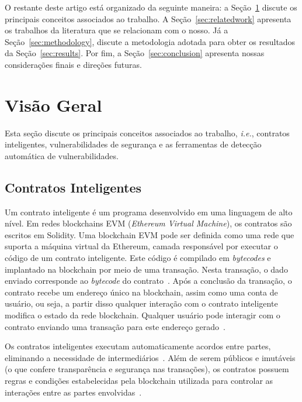 \documentclass[12pt]{article}
\begin{document}
O restante deste artigo está organizado da seguinte maneira: a Seção~\ref{sec:background} discute os principais conceitos associados ao trabalho. A Seção~\ref{sec:relatedwork} apresenta os trabalhos da literatura que se relacionam com o nosso. Já a Seção~\ref{sec:methodology}, discute a metodologia adotada para obter os resultados da Seção~\ref{sec:results}. Por fim, a Seção~\ref{sec:conclusion} apresenta nossas considerações finais e direções futuras.

\section{Visão Geral}\label{sec:background}

Esta seção discute os principais conceitos associados ao trabalho, \textit{i.e.}, contratos inteligentes, vulnerabilidades de segurança e as ferramentas de detecção automática de vulnerabilidades.

\subsection{Contratos Inteligentes}\label{subsec:smartcontracts}

Um contrato inteligente é um programa desenvolvido em uma linguagem de alto nível. Em redes blockchains EVM (\textit{Ethereum Virtual Machine}), os contratos são escritos em Solidity. Uma blockchain EVM pode ser definida como uma rede que suporta a máquina virtual da Ethereum, camada responsável por executar o código de um contrato inteligente. Este código é compilado em \textit{bytecodes} e implantado na blockchain por meio de uma transação. Nesta transação, o dado enviado corresponde ao \textit{bytecode} do contrato~\cite{wood2014ethereum}. Após a conclusão da transação, o contrato recebe um endereço único na blockchain, assim como uma conta de usuário, ou seja, a partir disso qualquer interação com o contrato inteligente modifica o estado da rede blockchain. Qualquer usuário pode interagir com o contrato enviando uma transação para este endereço gerado~\cite{harvey2021defi}. 

Os contratos inteligentes executam automaticamente acordos entre partes, eliminando a necessidade de intermediários~\cite{Campos2024}. Além de serem públicos e imutáveis (o que confere transparência e segurança nas transações), os contratos possuem regras e condições estabelecidas pela blockchain utilizada para controlar as interações entre as partes envolvidas~\cite{egelund2017automated}. 
\end{document}

